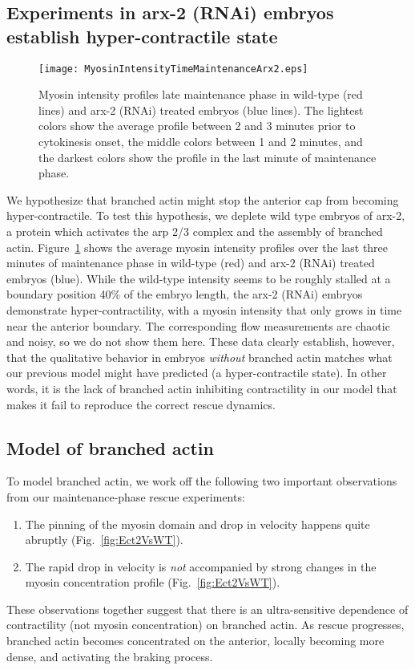 \documentclass[11pt]{article}
\newcommand{\6}[1]{#1_{\text{6}}}
\newcommand{\3}[1]{#1_{\text{3}}}
\begin{document}
\subsection{Experiments in arx-2 (RNAi) embryos establish hyper-contractile state}
\begin{figure}
\centering
\texttt{[image: MyosinIntensityTimeMaintenanceArx2.eps]}
\caption{\label{fig:Arp23Myosin} Myosin intensity profiles late maintenance phase in wild-type (red lines) and arx-2 (RNAi) treated embryos (blue lines). The lightest colors show the average profile between 2 and 3 minutes prior to cytokinesis onset, the middle colors between 1 and 2 minutes, and the darkest colors show the profile in the last minute of maintenance phase.}
\end{figure}

We hypothesize that branched actin might stop the anterior cap from becoming hyper-contractile. To test this hypothesis, we deplete wild type embryos of arx-2, a protein which activates the arp 2/3 complex and the assembly of branched actin. Figure\ \ref{fig:Arp23Myosin} shows the average myosin intensity profiles over the last three minutes of maintenance phase in wild-type (red) and arx-2 (RNAi) treated embryos (blue). While the wild-type intensity seems to be roughly stalled at a boundary position 40\% of the embryo length, the arx-2 (RNAi) embryos demonstrate hyper-contractility, with a myosin intensity that only grows in time near the anterior boundary. The corresponding flow measurements are chaotic and noisy, so we do not show them here. These data clearly establish, however, that the qualitative behavior in embryos \emph{without} branched actin matches what our previous model might have predicted (a hyper-contractile state). In other words, it is the lack of branched actin inhibiting contractility in our model that makes it fail to reproduce the correct rescue dynamics.


\subsection{Model of branched actin}
To model branched actin, we work off the following two important observations from our maintenance-phase rescue experiments:
\begin{enumerate}
\item The pinning of the myosin domain and drop in velocity happens quite abruptly (Fig.\ \ref{fig:Ect2VsWT}). 
\item The rapid drop in velocity is \emph{not} accompanied by strong changes in the myosin concentration profile (Fig.\ \ref{fig:Ect2VsWT}).
\end{enumerate}
These observations together suggest that there is an ultra-sensitive dependence of contractility (not myosin concentration) on branched actin. As rescue progresses, branched actin becomes concentrated on the anterior, locally becoming more dense, and activating the braking process. 
\end{document}
